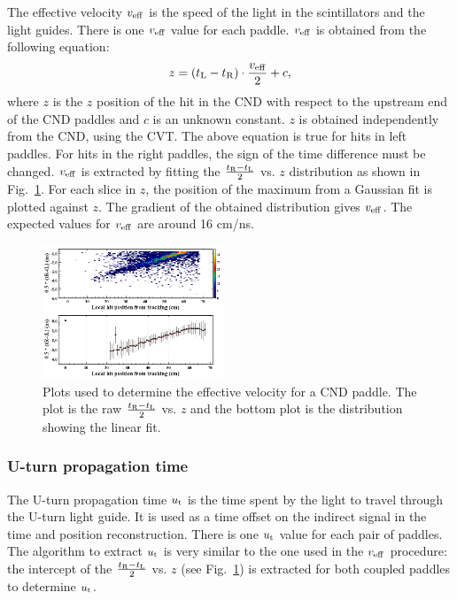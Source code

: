 The effective velocity $v_{\rm{eff}}$ is the speed of the light in the scintillators and the light guides. There is one $v_{\rm{eff}}$ value for each paddle. $v_{\rm{eff}}$ is obtained from the following equation:
\begin{equation}
z=(t_{\rm{L}}-t_{\rm{R}})\cdot \frac{v_{\rm{eff}}}{2} + c,
\end{equation}
where $z$ is the $z$ position of the hit in the CND with respect to the upstream end of the CND paddles and $c$ is an unknown constant. $z$ is obtained independently from the CND, using the CVT. The above equation is true for hits in left paddles. For hits in the right paddles, the sign of the time difference must be changed. $v_{\rm{eff}}$ is extracted by fitting the $\frac{t_{\rm{R}}-t_{\rm{L}}}{2}$ vs. $z$ distribution as shown in Fig.~\ref{effv}. For each slice in $z$, the position of the maximum from a Gaussian fit is plotted against $z$. The gradient of the obtained distribution gives $v_{\rm{eff}}$. The expected values for $v_{\rm{eff}}$ are around 16 cm/ns.

\begin{figure}[htb]
\begin{center}
\includegraphics[width=0.48\textwidth]{Figure/veff.png} 
\end{center}
\caption{Plots used to determine the effective velocity for a CND paddle. The plot is the raw $\frac{t_{\rm{R}}-t_{\rm{L}}}{2}$ vs. $z$ and the bottom plot is the distribution showing the linear fit.}
\label{effv}
\end{figure}

\subsubsection{U-turn propagation time}

The U-turn propagation time $u_{\rm{t}}$ is the time spent by the light to travel through the U-turn light guide. It is used as a time offset on the indirect signal in the time and position reconstruction. There is one $u_{\rm{t}}$ value for each pair of paddles.
The algorithm to extract $u_{\rm{t}}$ is very similar to the one used in the $v_{\rm{eff}}$ procedure: the intercept of the $\frac{t_{\rm{R}}-t_{\rm{L}}}{2}$ vs. $z$ (see Fig.~\ref{effv}) is extracted for both coupled paddles to determine $u_{\rm{t}}$.

